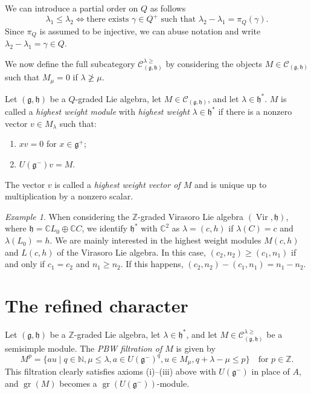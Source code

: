 \documentclass[a4paper, 12pt, reqno]{amsart}
\theoremstyle{remark}
\newtheorem{example}[theorem]{Example}
\DeclareMathOperator{\Vir}{Vir}
\DeclareMathOperator{\gr}{gr}
\begin{document}
We can introduce a partial order on $Q$ as follows
\begin{equation*}
  \lambda_1 \le \lambda_2 \iff \text{there exists $\gamma \in Q^+$ such that $\lambda_2 - \lambda_1 = \pi_Q(\gamma)$.}
\end{equation*}
Since $\pi_Q$ is assumed to be injective, we can abuse notation and write $\lambda_2 - \lambda_1 = \gamma \in Q$.

We now define the full subcategory $\mathcal{C}^{\lambda \ge}_{(\mathfrak{g}, \mathfrak{h})}$ by considering the objects $M \in \mathcal{C}_{(\mathfrak{g}, \mathfrak{h})}$ such that $M_{\mu} = 0$ if $\lambda \ngeq \mu$.

Let $(\mathfrak{g}, \mathfrak{h})$ be a $Q$-graded Lie algebra, let $M \in \mathcal{C}_{(\mathfrak{g}, \mathfrak{h})}$, and let $\lambda \in \mathfrak{h}^*$.
$M$ is called a \emph{highest weight module} with \emph{highest weight} $\lambda \in \mathfrak{h}^*$ if there is a nonzero vector $v \in M_{\lambda}$ such that:
\begin{enumerate}
\item $xv = 0$ for $x \in \mathfrak{g}^+$;
\item $U(\mathfrak{g}^-)v = M$.
\end{enumerate}
The vector $v$ is called a \emph{highest weight vector of $M$} and is unique up to multiplication by a nonzero scalar.

\begin{example}
  \label{exa:3}
  When considering the $\mathbb{Z}$-graded Virasoro Lie algebra $(\Vir, \mathfrak{h})$, where $\mathfrak{h} = \mathbb{C}L_0 \oplus \mathbb{C}C$, we identify $\mathfrak{h}^*$ with $\mathbb{C}^2$ as $\lambda = (c, h)$ if $\lambda(C) = c$ and $\lambda(L_0) = h$.
  We are mainly interested in the highest weight modules $M(c, h)$ and $L(c, h)$ of the Virasoro Lie algebra.
  In this case, $(c_2, n_2) \ge (c_1, n_1)$ if and only if $c_1 = c_2$ and $n_1 \ge n_2$.
  If this happens, $(c_2, n_2) - (c_1, n_1) = n_1 - n_2$.
\end{example}

\section{The refined character}
\label{sec:refined-character}

Let $(\mathfrak{g}, \mathfrak{h})$ be a $\mathbb{Z}$-graded Lie algebra, let $\lambda \in \mathfrak{h}^*$, and let $M \in \mathcal{C}^{\lambda \ge}_{(\mathfrak{g}, \mathfrak{h})}$ be a semisimple module.
The \emph{PBW filtration of $M$} is given by
\begin{equation*}
  M^p = \{au \mid q \in \mathbb{N}, \mu \le \lambda, a \in U(\mathfrak{g}^-)^q, u \in M_{\mu}, q + \lambda - \mu \le p\} \quad \text{for $p \in \mathbb{Z}$}.
\end{equation*}
This filtration clearly satisfies axioms (i)--(iii) above with $U(\mathfrak{g}^-)$ in place of $A$, and $\gr(M)$ becomes a $\gr(U(\mathfrak{g^-}))$-module.
\end{document}

